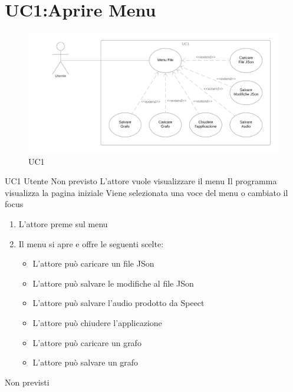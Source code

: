 \documentclass[../AnalisideiRequisiti.tex]{subfiles}
\begin{document}
	\section{UC1:Aprire Menu}
	\begin{figure}[H]
	\caption{UC1}
	\centering
	\includegraphics[width=\textwidth]{../img/UC01.png}
	\end{figure}
	\UserCase
	{UC1}
	{Utente}
	{Non previsto}
	{L'attore vuole visualizzare il menu}
	{Il programma visualizza la pagina iniziale }
	{Viene selezionata una voce del menu o cambiato il focus}
	{	\begin{enumerate}
			\item{} L'attore preme sul menu
			\item{} Il menu si apre e offre le seguenti scelte:
		\begin{itemize}
		\item{} L'attore può caricare un file JSon 
		\item{} L'attore può salvare le modifiche al file JSon 
		\item{} L'attore può salvare l'audio prodotto da Speect 
		\item{} L'attore può chiudere l'applicazione 
		\item{} L'attore può caricare un grafo 
		\item{} L'attore può salvare un grafo 
		\end{itemize}
	\end{enumerate}
	}
	{Non previsti}
\end{document}
